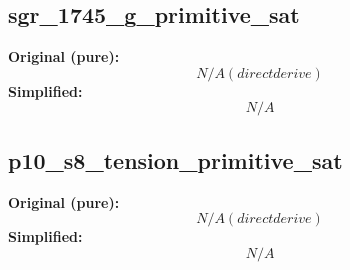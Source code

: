 \subsection{sgr_1745_g_primitive_sat}
\textbf{Original (pure):}
\begin{equation}
N/A (direct derive)
\end{equation}
\textbf{Simplified:}
\begin{equation}
N/A
\end{equation}

\subsection{p10_s8_tension_primitive_sat}
\textbf{Original (pure):}
\begin{equation}
N/A (direct derive)
\end{equation}
\textbf{Simplified:}
\begin{equation}
N/A
\end{equation}

